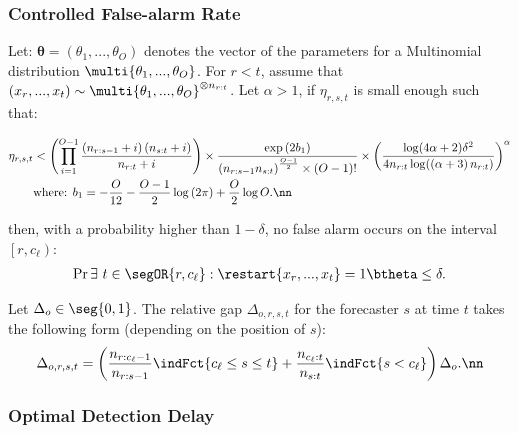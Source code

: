 \documentclass{article} %
\begin{document}
\subsubsection{Controlled False-alarm Rate}
\begin{theorem}
Let: $\boldsymbol{\theta}  = \left(\theta_1,..., \theta_O \right)$ denotes the vector of the parameters for a Multinomial distribution $\multi{\theta_1,..., \theta_O}$. For $r < t$, assume that $\left(x_r, ..., x_t\right) \sim \multi{\theta_1,..., \theta_O}^{\otimes n_{r:t}}$. Let $\alpha > 1$, if $\eta_{r,s,t}$  is small enough such that:

\begin{align}
\eta_{r,s,t} &< \left( \prod_{i=1}^{O-1} \frac{\left( n_{r:s-1}+i  \right)\left( n_{s:t}+i  \right)}{n_{r:t}+i} \right) \times \frac{\exp{(2b_1)}}{\left( n_{r:s-1} n_{s:t} \right)^{\frac{O-1}{2}} \times (O-1)! } \times \left(\frac{\log(4\alpha+2)\delta^2}{4n_{r:t}\log(\left( \alpha+3 \right) n_{r:t})} \right)^\alpha \label{Eq::UBEta} \\
&\text{where: } b_1 = -\frac{O}{12}- \frac{O-1}{2} \log \left(2\pi \right) + \frac{O}{2} \log O. \nn
\end{align}

 
	then, with a probability higher than $1-\delta$, no false alarm occurs on the interval $\left[r, c_\ell \right) $:
	\begin{align*}
	\Pr{\exists\  t \in \segOR{r, c_\ell}: \restart{x_r,...,x_t} = 1 }{\btheta} \leq  \delta.
	\end{align*}
	\label{Theorem:FalseAlarmRate}
\end{theorem}

\begin{definition}
Let $\Delta_o \in \seg{0,1}$. The relative gap $\Delta_{o,r,s,t}$ for the forecaster $s$ at time $t$ takes the following form (depending on the position of $s$):
    \begin{align}
	\Delta_{o,r,s,t} = \left( \frac{ n_{r:c_\ell-1}}{ n_{r:s-1}} \indFct{c_\ell\leq s \leq t} + \frac{n_{c_\ell:t}}{ n_{s:t}} \indFct{s < c_\ell} \right)\Delta_o. \nn
	\end{align}
\end{definition}

\vspace{-1em}

\subsubsection{Optimal Detection Delay}
\end{document}
